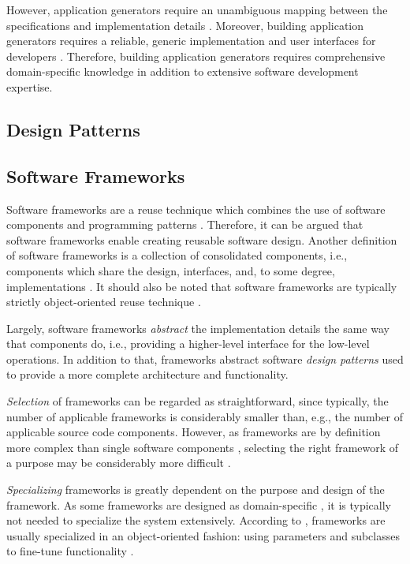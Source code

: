 However, application generators require an unambiguous mapping between the specifications and implementation details \citep[chap.~7]{krueger_software_1992}. Moreover, building application generators requires a reliable, generic implementation and user interfaces for developers \citep{cleaveland_building_1988}. Therefore, building application generators requires comprehensive domain-specific knowledge in addition to extensive software development expertise.

\subsection{Design Patterns}


\subsection{Software Frameworks}

Software frameworks are a reuse technique which combines the use of software components and programming patterns \citep{johnson_frameworkscomponents+_1997}. Therefore, it can be argued that software frameworks enable creating reusable software design. Another definition of software frameworks is a collection of consolidated components, i.e., components which share the design, interfaces, and, to some degree, implementations \citep{johnson_frameworkscomponents+_1997}. It should also be noted that software frameworks are typically strictly object-oriented reuse technique \citep{johnson_frameworkscomponents+_1997}.

Largely, software frameworks \emph{abstract} the implementation details the same way that components do, i.e., providing a higher-level interface for the low-level operations. In addition to that, frameworks abstract software \emph{design patterns} used to provide a more complete architecture and functionality.

\emph{Selection} of frameworks can be regarded as straightforward, since typically, the number of applicable frameworks is considerably smaller than, e.g., the number of applicable source code components. However, as frameworks are by definition more complex than single software components \citep{johnson_frameworkscomponents+_1997}, selecting the right framework of a purpose may be considerably more difficult \citep{fayad_enterprise_2000}.

\emph{Specializing} frameworks is greatly dependent on the purpose and design of the framework. As some frameworks are designed as domain-specific \citep{johnson_frameworkscomponents+_1997}, it is typically not needed to specialize the system extensively. According to \citet{brugali_framework_1997}, frameworks are usually specialized in an object-oriented fashion: using parameters and subclasses to fine-tune functionality \citep{brugali_framework_1997}.

